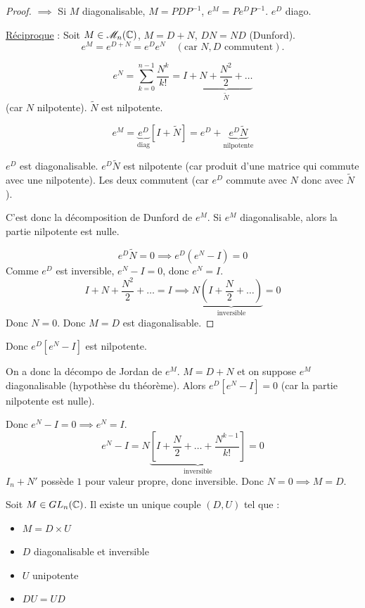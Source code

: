 \begin{proof}
    $\implies$ Si $M$ diagonalisable, $M = P D P^{-1}$, $e^M = P e^D P^{-1}$. $e^D$ diago.

    \uline{Réciproque} :
    Soit $M \in \mathscr M_n(\mathbb{C})$, $M = D + N$, $DN=ND$ (Dunford).
    \[ e^M = e^{D+N} = e^D e^N \quad (\text{car } N, D \text{ commutent}). \]

    \[ e^N = \sum_{k=0}^{n-1} \frac{N^k}{k!} = I + \underbrace{N + \frac{N^2}{2} + \dots}_{\tilde N} \]
    (car $N$ nilpotente). $\tilde N$ est nilpotente.

    \[ e^M = \underbrace{e^D}_{\text{diag}} [ I + \tilde N ] = e^D + \underbrace{e^D \tilde N}_{\text{nilpotente}} \]

    $e^D$ est diagonalisable.
    $e^D \tilde N$ est nilpotente (car produit d'une matrice qui commute avec une nilpotente).
    Les deux commutent (car $e^D$ commute avec $N$ donc avec $\tilde N$).

    C'est donc la décomposition de Dunford de $e^M$.
    Si $e^M$ diagonalisable, alors la partie nilpotente est nulle.

    \[ e^D \tilde N = 0 \implies e^D (e^N - I) = 0 \]
    Comme $e^D$ est inversible, $e^N - I = 0$, donc $e^N = I$.
    \[ I + N + \frac{N^2}{2} + \dots = I \implies N \underbrace{\left( I + \frac{N}{2} + \dots \right)}_{\text{inversible}} = 0 \]
    Donc $N = 0$.
    Donc $M = D$ est diagonalisable.
\end{proof}

Donc $e^D [ e^N - I ]$ est nilpotente.

On a donc la décompo de Jordan de $e^M$.
$M = D+N$ et on suppose $e^M$ diagonalisable (hypothèse du théorème).
Alors $e^D [ e^N - I ] = 0$ (car la partie nilpotente est nulle).

Donc $e^N - I = 0 \implies e^N = I$.
\[ e^N - I = N \underbrace{\left[ I + \frac{N}{2} + \dots + \frac{N^{k-1}}{k!} \right]}_{\text{inversible}} = 0 \]
$I_n + N'$ possède $1$ pour valeur propre, donc inversible.
Donc $N = 0 \implies M = D$.

\lvspace
{}

\begin{theoreme}{}{}
    Soit $M \in GL_n(\mathbb{C})$. Il existe un unique couple $(D, U)$ tel que :
    \begin{itemize}
        \item $M = D \times U$
        \item $D$ diagonalisable et inversible
        \item $U$ unipotente
        \item $D U = U D$
    \end{itemize}
\end{theoreme}

